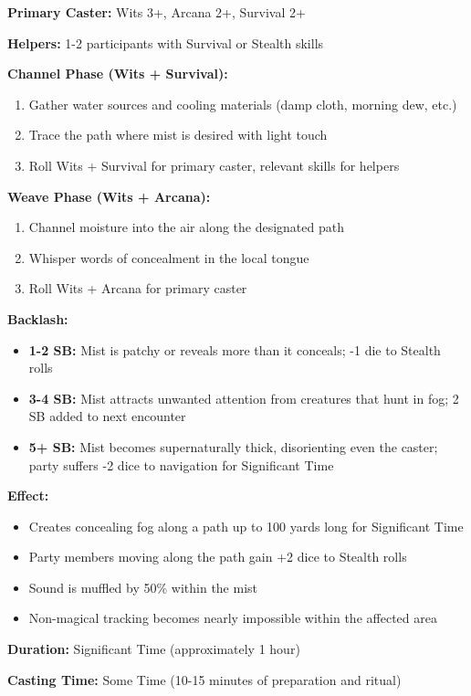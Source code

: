\textbf{Primary Caster:} Wits 3+, Arcana 2+, Survival 2+

\textbf{Helpers:} 1-2 participants with Survival or Stealth skills

\textbf{Channel Phase (Wits + Survival):}
\begin{enumerate}
\item Gather water sources and cooling materials (damp cloth, morning dew, etc.)
\item Trace the path where mist is desired with light touch
\item Roll Wits + Survival for primary caster, relevant skills for helpers
\end{enumerate}

\textbf{Weave Phase (Wits + Arcana):}
\begin{enumerate}
\item Channel moisture into the air along the designated path
\item Whisper words of concealment in the local tongue
\item Roll Wits + Arcana for primary caster
\end{enumerate}

\textbf{Backlash:}
\begin{itemize}
\item \textbf{1-2 SB:} Mist is patchy or reveals more than it conceals; -1 die to Stealth rolls
\item \textbf{3-4 SB:} Mist attracts unwanted attention from creatures that hunt in fog; 2 SB added to next encounter
\item \textbf{5+ SB:} Mist becomes supernaturally thick, disorienting even the caster; party suffers -2 dice to navigation for Significant Time
\end{itemize}

\textbf{Effect:}
\begin{itemize}
\item Creates concealing fog along a path up to 100 yards long for Significant Time
\item Party members moving along the path gain +2 dice to Stealth rolls
\item Sound is muffled by 50\% within the mist
\item Non-magical tracking becomes nearly impossible within the affected area
\end{itemize}

\textbf{Duration:} Significant Time (approximately 1 hour)

\textbf{Casting Time:} Some Time (10-15 minutes of preparation and ritual)

